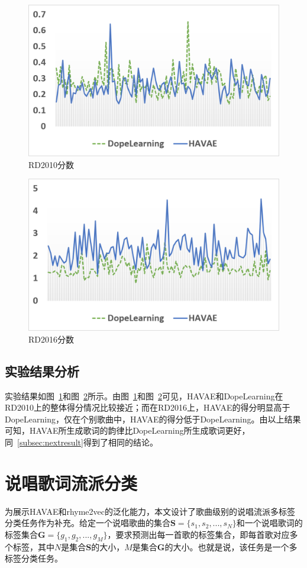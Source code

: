 \begin{figure}[h]
    \centering
    \includegraphics[width=12cm]{rd2010.png}
    \caption{RD2010分数}
    \label{fig:rd2010}
\end{figure}
\begin{figure}[!h]
    \centering
    \includegraphics[width=12cm]{rd2016.png}
    \caption{RD2016分数}
    \label{fig:rd2016}
\end{figure}

\subsection{实验结果分析}

实验结果如图~\ref{fig:rd2010}和图~\ref{fig:rd2016}所示。由图~\ref{fig:rd2010}和图~\ref{fig:rd2016}可见，HAVAE和DopeLearning在RD2010上的整体得分情况比较接近；而在RD2016上，HAVAE的得分明显高于DopeLearning，仅在个别歌曲中，HAVAE的得分低于DopeLearning。由以上结果可知，HAVAE所生成歌词的韵律比DopeLearning所生成歌词更好，同~\ref{subsec:nextresult}得到了相同的结论。\par

\section{说唱歌词流派分类} \label{sec:clf}
为展示HAVAE和rhyme2vec的泛化能力，本文设计了歌曲级别的说唱流派多标签分类任务作为补充。给定一个说唱歌曲的集合$\bm S = \{s_1, s_2, ... , s_N\}$和一个说唱歌词的标签集合$\bm G = \{g_1, g_2, ... , g_M\}$，要求预测出每一首歌的标签集合，即每首歌对应多个标签，其中$N$是集合$\bm S$的大小，$M$是集合$\bm G$的大小。也就是说，该任务是一个多标签分类任务。\par

